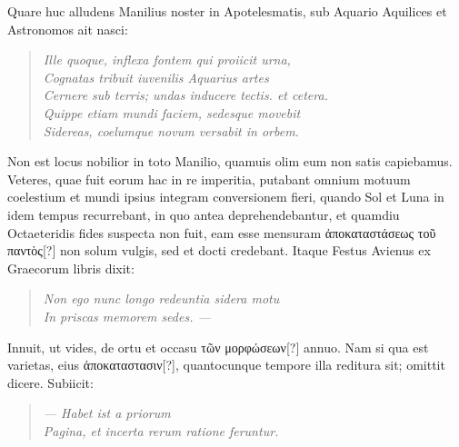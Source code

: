 Quare huc alludens Manilius noster in Apotelesmatis,
 sub Aquario
Aquilices et Astronomos ait nasci:
\begin{quote}
  \emph{Ille quoque, inflexa fontem qui proiicit urna,\\
  Cognatas tribuit iuvenilis Aquarius artes\\
  Cernere sub terris; undas inducere tectis. et cetera.\\
  Quippe etiam mundi faciem, sedesque movebit\\
  Sidereas, coelumque novum versabit in orbem.}
\end{quote}
Non est locus nobilior in toto Manilio, quamuis olim eum non satis
capiebamus.
Veteres, quae fuit eorum hac in re imperitia, putabant
omnium motuum coelestium et mundi ipsius integram conversionem
fieri, quando Sol et Luna in idem tempus recurrebant,
in quo antea deprehendebantur, et quamdiu Octaeteridis
fides suspecta non fuit, eam esse mensuram
 \textgreek{ἀποκαταστάσεως τοῦ παντὸς[?]}
non solum vulgis, sed et docti credebant.
Itaque Festus Avienus ex
Graecorum libris dixit:
\begin{quote}
  \emph{Non ego nunc longo redeuntia sidera motu\\
  In priscas memorem sedes. ---}
\end{quote}
Innuit, ut vides, de ortu et occasu
 \textgreek{τῶν μορφώσεων[?]} annuo.
Nam si qua
est varietas, eius \textgreek{ἀποκαταστασιν[?]},
 quantocunque tempore illa reditura
sit; omittit dicere.
Subiicit:
\begin{quote}
  \emph{--- Habet ist a priorum\\
  Pagina, et incerta rerum ratione feruntur.}
\end{quote}
